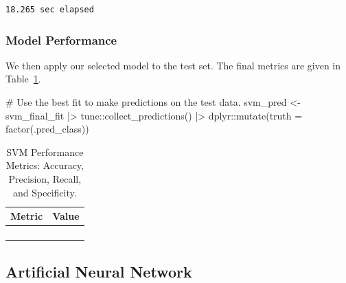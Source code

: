 \documentclass[
  letterpaper,
  DIV=11,
  numbers=noendperiod]{scrartcl}
\newenvironment{Shaded}{\begin{snugshade}}{\end{snugshade}}
\newcommand{\AttributeTok}[1]{\textcolor[rgb]{0.40,0.45,0.13}{#1}}
\newcommand{\CommentTok}[1]{\textcolor[rgb]{0.37,0.37,0.37}{#1}}
\newcommand{\FunctionTok}[1]{\textcolor[rgb]{0.28,0.35,0.67}{#1}}
\newcommand{\NormalTok}[1]{\textcolor[rgb]{0.00,0.23,0.31}{#1}}
\newcommand{\OtherTok}[1]{\textcolor[rgb]{0.00,0.23,0.31}{#1}}
\newcommand{\SpecialCharTok}[1]{\textcolor[rgb]{0.37,0.37,0.37}{#1}}
\begin{document}
\begin{verbatim}
18.265 sec elapsed
\end{verbatim}

\subsubsection{Model Performance}\label{model-performance-1}

We then apply our selected model to the test set. The final metrics are
given in Table~\ref{tbl-svm-performance}.

\begin{Shaded}
\begin{Highlighting}[]
\CommentTok{\# Use the best fit to make predictions on the test data.}
\NormalTok{svm\_pred }\OtherTok{\textless{}{-}} 
\NormalTok{  svm\_final\_fit }\SpecialCharTok{|\textgreater{}} 
\NormalTok{  tune}\SpecialCharTok{::}\FunctionTok{collect\_predictions}\NormalTok{() }\SpecialCharTok{|\textgreater{}}
\NormalTok{  dplyr}\SpecialCharTok{::}\FunctionTok{mutate}\NormalTok{(}\AttributeTok{truth =} \FunctionTok{factor}\NormalTok{(.pred\_class))}
\end{Highlighting}
\end{Shaded}

\begin{longtable}{>{\raggedright\arraybackslash}p{}>{\raggedleft\arraybackslash}p{}}

\caption{\label{tbl-svm-performance}SVM Performance Metrics: Accuracy,
Precision, Recall, and Specificity.}

\tabularnewline

\toprule
Metric & Value \\ 
\midrule\addlinespace[2.5pt]
\cellcolor[HTML]{FFFFFF}{Accuracy} & \cellcolor[HTML]{FFFFFF}{78.0} \\ 
\cellcolor[HTML]{FFFFFF}{Precision} & \cellcolor[HTML]{FFFFFF}{23.1} \\ 
\cellcolor[HTML]{FFFFFF}{Recall} & \cellcolor[HTML]{FFFFFF}{100.0} \\ 
\cellcolor[HTML]{FFFFFF}{Specificity} & \cellcolor[HTML]{FFFFFF}{76.5} \\ 
\bottomrule

\end{longtable}

\subsection{Artificial Neural Network}\label{artificial-neural-network}
\end{document}
